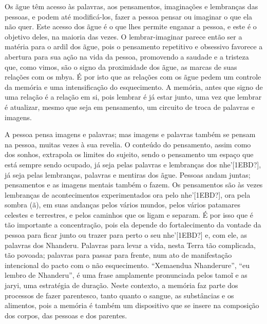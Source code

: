 \documentclass{article}
\begin{document}
Os \~ague t\^em acesso \`as palavras, aos pensamentos, imagina\c{c}\~oes
e lembran\c{c}as das pessoas, e podem at\'e modific\'a-los, fazer a
pessoa pensar ou imaginar o que ela n\~ao quer. Este acesso dos \~ague
\'e o que lhes permite enganar a pessoa, e este \'e o objetivo deles,
na maioria das vezes. O lembrar-imaginar parece ent\~ao ser a mat\'eria
para o ardil dos \~ague, pois o pensamento repetitivo e obsessivo
favorece a abertura para sua a\c{c}\~ao na vida da pessoa, promovendo a
saudade e a tristeza que, como vimos, s\~ao o signo da proximidade dos
\~ague, as marcas de suas rela\c{c}\~oes com os mbya. \'E por isto que
as rela\c{c}\~oes com os \~ague pedem um controle da mem\'oria e uma
intensifica\c{c}\~ao do esquecimento. A mem\'oria, antes que signo de
uma rela\c{c}\~ao \'e a rela\c{c}\~ao em si, pois lembrar \'e j\'a
estar junto, uma vez que lembrar \'e atualizar, mesmo que seja em
pensamento, um circuito de troca de palavras e imagens.

A pessoa pensa imagens e palavras; mas imagens e palavras tamb\'em se
pensam na pessoa, muitas vezes \`a sua revelia. O conte\'udo do
pensamento, assim como dos sonhos, extrapola os limites do sujeito,
sendo o pensamento um espa\c{c}o que est\'a sempre sendo ocupado, j\'a
seja pelas palavras e lembran\c{c}as dos nhe{\textquoteright}[1EBD?],
j\'a seja pelas lembran\c{c}as, palavras e mentiras dos \~ague. Pessoas
andam juntas; pensamentos e as imagens mentais tamb\'em o fazem. Os
pensamentos s\~ao \`as vezes lembran\c{c}as de acontecimentos
experimentados ora pelo nhe{\textquoteright}[1EBD?], ora pela sombra
(\~a), em suas andan\c{c}as pelos v\'arios mundos, pelos v\'arios
patamares celestes e terrestres, e pelos caminhos que os ligam e
separam. \'E por isso que \'e t\~ao importante a concentra\c{c}\~ao,
pois ela depende do fortalecimento da vontade da pessoa para ficar
junto ou trazer para perto o seu nhe{\textquoteright}[1EBD?] e, com
ele, as palavras dos Nhanderu. Palavras para levar a vida, nesta Terra
t\~ao complicada, t\~ao povoada; palavras para passar para frente, num
ato de manifesta\c{c}\~ao intencional do pacto com o n\~ao
esquecimento. {\textquotedblleft}Xemaendua
Nhanderure{\textquotedblright}, {\textquotedblleft}eu lembro de
Nhanderu{\textquotedblright}, \'e uma frase amplamente pronunciada
pelos tamo\~{i} e as jaryi, uma estrat\'egia de dura\c{c}\~ao. Neste
contexto, a mem\'oria faz parte dos processos de fazer parentesco,
tanto quanto o sangue, as subst\^ancias e os alimentos, pois a
mem\'oria \'e tamb\'em um dispositivo que se insere na composi\c{c}\~ao
dos corpos, das pessoas e dos parentes.
\end{document}

